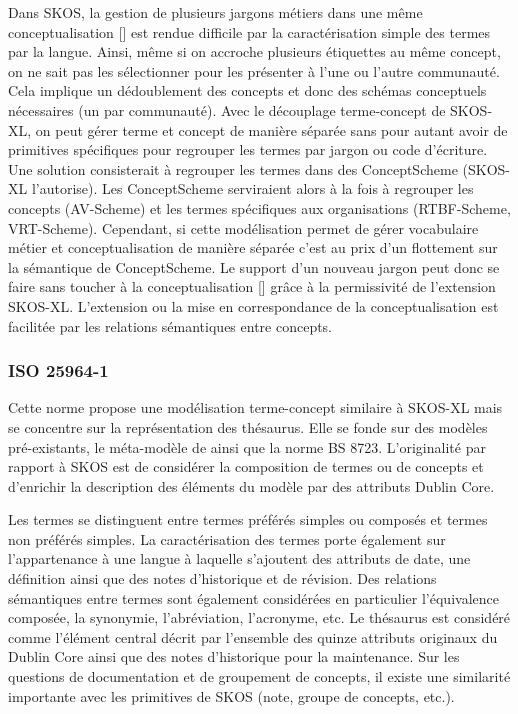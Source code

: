 Dans SKOS, la gestion de plusieurs jargons métiers dans une même conceptualisation [] est rendue difficile par la caractérisation simple des termes par la langue. 
Ainsi, même si on accroche plusieurs étiquettes au même concept, on ne sait pas les sélectionner pour les présenter à l'une ou l'autre communauté. 
Cela implique un dédoublement des concepts et donc des schémas conceptuels nécessaires (un par communauté). %
Avec le découplage terme-concept de SKOS-XL, on peut gérer terme et concept de manière séparée sans pour autant avoir de primitives spécifiques pour regrouper les termes par jargon ou code d'écriture. %
Une solution consisterait à regrouper les termes dans des ConceptScheme (SKOS-XL l'autorise).
Les ConceptScheme serviraient alors à la fois à regrouper les concepts (AV-Scheme) et les termes spécifiques aux organisations (RTBF-Scheme, VRT-Scheme). 
Cependant, si cette modélisation permet de gérer vocabulaire métier et conceptualisation de manière séparée c'est au prix d'un flottement sur la sémantique de ConceptScheme. 
Le support d'un nouveau jargon peut donc se faire sans toucher à la conceptualisation [] grâce à la permissivité de l'extension SKOS-XL. 
L'extension ou la mise en correspondance de la conceptualisation est facilitée par les relations sémantiques entre concepts.


\subsubsection{ISO 25964-1}
Cette norme propose une modélisation terme-concept similaire à SKOS-XL mais se concentre sur la représentation des thésaurus. 
Elle se fonde sur des modèles pré-existants, le méta-modèle de \cite{Vandenbussche2009} ainsi que la norme BS 8723. 
L'originalité par rapport à SKOS est de considérer la composition de termes ou de concepts et d'enrichir la description des éléments du modèle par des attributs Dublin Core.

Les termes se distinguent entre termes préférés simples ou composés et termes non préférés simples. 
La caractérisation des termes porte également sur l'appartenance à une langue à laquelle s'ajoutent des attributs de date, une définition ainsi que des notes d'historique et de révision. 
Des relations sémantiques entre termes sont également considérées en particulier l'équivalence composée, la synonymie, l'abréviation, l'acronyme, etc. 
Le thésaurus est considéré comme l'élément central décrit par l'ensemble des quinze attributs originaux du Dublin Core ainsi que des notes d'historique pour la maintenance. 
Sur les questions de documentation et de groupement de concepts, il existe une similarité importante avec les primitives de SKOS (note, groupe de concepts, etc.).\\


